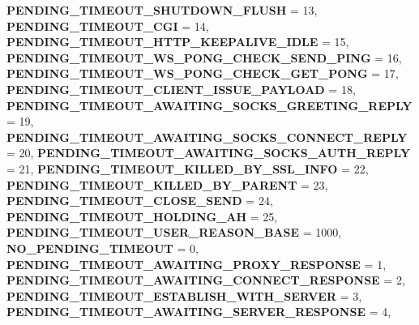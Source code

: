 \begin{DoxyCompactItemize}
\newline
{\bfseries P\+E\+N\+D\+I\+N\+G\+\_\+\+T\+I\+M\+E\+O\+U\+T\+\_\+\+S\+H\+U\+T\+D\+O\+W\+N\+\_\+\+F\+L\+U\+SH} = 13, 
{\bfseries P\+E\+N\+D\+I\+N\+G\+\_\+\+T\+I\+M\+E\+O\+U\+T\+\_\+\+C\+GI} = 14, 
{\bfseries P\+E\+N\+D\+I\+N\+G\+\_\+\+T\+I\+M\+E\+O\+U\+T\+\_\+\+H\+T\+T\+P\+\_\+\+K\+E\+E\+P\+A\+L\+I\+V\+E\+\_\+\+I\+D\+LE} = 15, 
{\bfseries P\+E\+N\+D\+I\+N\+G\+\_\+\+T\+I\+M\+E\+O\+U\+T\+\_\+\+W\+S\+\_\+\+P\+O\+N\+G\+\_\+\+C\+H\+E\+C\+K\+\_\+\+S\+E\+N\+D\+\_\+\+P\+I\+NG} = 16, 
\newline
{\bfseries P\+E\+N\+D\+I\+N\+G\+\_\+\+T\+I\+M\+E\+O\+U\+T\+\_\+\+W\+S\+\_\+\+P\+O\+N\+G\+\_\+\+C\+H\+E\+C\+K\+\_\+\+G\+E\+T\+\_\+\+P\+O\+NG} = 17, 
{\bfseries P\+E\+N\+D\+I\+N\+G\+\_\+\+T\+I\+M\+E\+O\+U\+T\+\_\+\+C\+L\+I\+E\+N\+T\+\_\+\+I\+S\+S\+U\+E\+\_\+\+P\+A\+Y\+L\+O\+AD} = 18, 
{\bfseries P\+E\+N\+D\+I\+N\+G\+\_\+\+T\+I\+M\+E\+O\+U\+T\+\_\+\+A\+W\+A\+I\+T\+I\+N\+G\+\_\+\+S\+O\+C\+K\+S\+\_\+\+G\+R\+E\+E\+T\+I\+N\+G\+\_\+\+R\+E\+P\+LY} = 19, 
{\bfseries P\+E\+N\+D\+I\+N\+G\+\_\+\+T\+I\+M\+E\+O\+U\+T\+\_\+\+A\+W\+A\+I\+T\+I\+N\+G\+\_\+\+S\+O\+C\+K\+S\+\_\+\+C\+O\+N\+N\+E\+C\+T\+\_\+\+R\+E\+P\+LY} = 20, 
\newline
{\bfseries P\+E\+N\+D\+I\+N\+G\+\_\+\+T\+I\+M\+E\+O\+U\+T\+\_\+\+A\+W\+A\+I\+T\+I\+N\+G\+\_\+\+S\+O\+C\+K\+S\+\_\+\+A\+U\+T\+H\+\_\+\+R\+E\+P\+LY} = 21, 
{\bfseries P\+E\+N\+D\+I\+N\+G\+\_\+\+T\+I\+M\+E\+O\+U\+T\+\_\+\+K\+I\+L\+L\+E\+D\+\_\+\+B\+Y\+\_\+\+S\+S\+L\+\_\+\+I\+N\+FO} = 22, 
{\bfseries P\+E\+N\+D\+I\+N\+G\+\_\+\+T\+I\+M\+E\+O\+U\+T\+\_\+\+K\+I\+L\+L\+E\+D\+\_\+\+B\+Y\+\_\+\+P\+A\+R\+E\+NT} = 23, 
{\bfseries P\+E\+N\+D\+I\+N\+G\+\_\+\+T\+I\+M\+E\+O\+U\+T\+\_\+\+C\+L\+O\+S\+E\+\_\+\+S\+E\+ND} = 24, 
\newline
{\bfseries P\+E\+N\+D\+I\+N\+G\+\_\+\+T\+I\+M\+E\+O\+U\+T\+\_\+\+H\+O\+L\+D\+I\+N\+G\+\_\+\+AH} = 25, 
{\bfseries P\+E\+N\+D\+I\+N\+G\+\_\+\+T\+I\+M\+E\+O\+U\+T\+\_\+\+U\+S\+E\+R\+\_\+\+R\+E\+A\+S\+O\+N\+\_\+\+B\+A\+SE} = 1000, 
{\bfseries N\+O\+\_\+\+P\+E\+N\+D\+I\+N\+G\+\_\+\+T\+I\+M\+E\+O\+UT} = 0, 
{\bfseries P\+E\+N\+D\+I\+N\+G\+\_\+\+T\+I\+M\+E\+O\+U\+T\+\_\+\+A\+W\+A\+I\+T\+I\+N\+G\+\_\+\+P\+R\+O\+X\+Y\+\_\+\+R\+E\+S\+P\+O\+N\+SE} = 1, 
\newline
{\bfseries P\+E\+N\+D\+I\+N\+G\+\_\+\+T\+I\+M\+E\+O\+U\+T\+\_\+\+A\+W\+A\+I\+T\+I\+N\+G\+\_\+\+C\+O\+N\+N\+E\+C\+T\+\_\+\+R\+E\+S\+P\+O\+N\+SE} = 2, 
{\bfseries P\+E\+N\+D\+I\+N\+G\+\_\+\+T\+I\+M\+E\+O\+U\+T\+\_\+\+E\+S\+T\+A\+B\+L\+I\+S\+H\+\_\+\+W\+I\+T\+H\+\_\+\+S\+E\+R\+V\+ER} = 3, 
{\bfseries P\+E\+N\+D\+I\+N\+G\+\_\+\+T\+I\+M\+E\+O\+U\+T\+\_\+\+A\+W\+A\+I\+T\+I\+N\+G\+\_\+\+S\+E\+R\+V\+E\+R\+\_\+\+R\+E\+S\+P\+O\+N\+SE} = 4, 

\end{DoxyCompactItemize}
